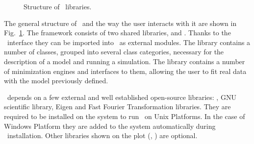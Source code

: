 \begin{figure}[htbp]
\centering
\caption{
Structure of \BornAgain\ libraries.
}
\label{fig:two_ratios}
\end{figure}


The general structure of \BornAgain\ and the way the user interacts with it are
shown in Fig.~\ref{fig:two_ratios}.
The framework consists of two shared libraries,  and
. Thanks to the \Python\ interface they can be imported into \Python\ as external modules. The library  contains a number of classes, grouped into several class categories, necessary for the description of a model and running a simulation.
The library   contains a number of minimization engines 
and interfaces to them, allowing the user to fit real data with the model previously defined.

\BornAgain\ depends on a few external and well established
open-source libraries: , GNU scientific library, Eigen and
Fast Fourier Transformation libraries. They are required to be
installed on the system to run \BornAgain\ on Unix Platforms. In the
case of Windows Platform they are added to the system automatically during \BornAgain\ installation. Other libraries shown
on the plot (, ) are optional.

 







